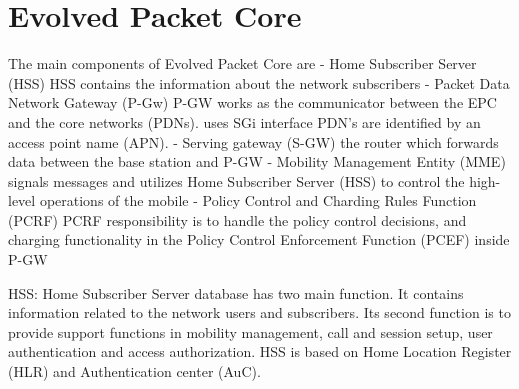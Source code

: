 
\section{Evolved Packet Core}
\label{section:evolved-packet-core}

The main components of Evolved Packet Core are
  - Home Subscriber Server (HSS)
    HSS contains the information about the network subscribers
  - Packet Data Network Gateway (P-Gw)
    P-GW works as the communicator between the EPC and the core networks (PDNs).
    uses SGi interface
    PDN's are identified by an access point name (APN).
  - Serving gateway (S-GW)
    the router which forwards data between the base station and P-GW
  - Mobility Management Entity (MME)
    signals messages and utilizes Home Subscriber Server (HSS) to control the high-level operations of the mobile
  - Policy Control and Charding Rules Function (PCRF)
    PCRF responsibility is to handle the policy control decisions, and charging functionality in the Policy Control Enforcement Function (PCEF) inside P-GW


HSS:
Home Subscriber Server database has two main function. It contains information related to the network users and subscribers. Its second function is to provide support functions in mobility management, call and session setup, user authentication and access authorization. HSS is based on Home Location Register (HLR) and Authentication center (AuC).




